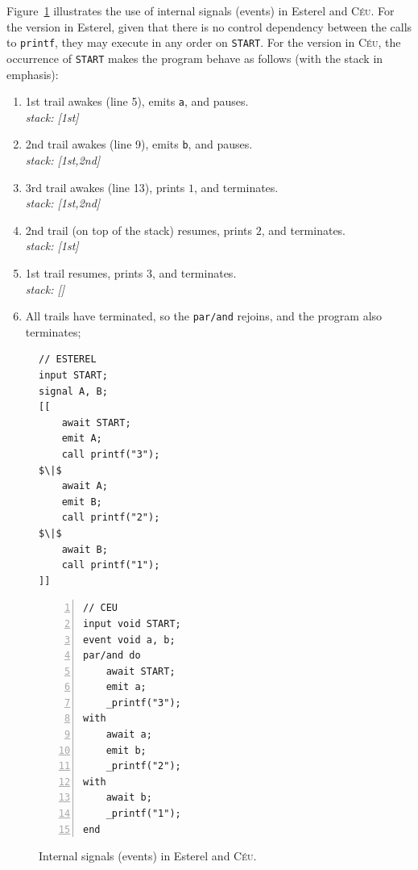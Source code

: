 \documentclass{acm_proc_article-sp}
\newcommand{\CEU}{\textsc{C\'{e}u}\xspace}
\newcommand{\code}[1] {{\small{\texttt{#1}}}}
\newcommand{\1}{\;}
\newcommand{\2}{\;\;}
\newcommand{\3}{\;\;\;}
\newcommand{\5}{\;\;\;\;\;}
\begin{document}
Figure~\ref{lst.prints} illustrates the use of internal signals (events) in 
Esterel and \CEU.
%
For the version in Esterel, given that there is no control dependency between 
the calls to \code{printf}, they may execute in any order on \code{START}.
%
For the version in \CEU, the occurrence of \code{START} makes the program 
behave as follows (with the stack in emphasis):
%
{\small
\begin{enumerate}
\setlength{\itemsep}{0pt}
\item 1st trail awakes (line 5), emits \code{a}, and pauses.\\
    \emph{stack: [1st]}
\item 2nd trail awakes (line 9), emits \code{b}, and pauses.\\
    \emph{stack: [1st,2nd]}
\item 3rd trail awakes (line 13), prints $1$, and terminates.\\
    \emph{stack: [1st,2nd]}
\item 2nd trail (on top of the stack) resumes, prints $2$, and terminates.\\
    \emph{stack: [1st]}
\item 1st trail resumes, prints $3$, and terminates.\\
    \emph{stack: []}
\item All trails have terminated, so the \code{par/and} rejoins, and the 
program also terminates;
\end{enumerate}
}

\begin{figure}[!t]
\begin{minipage}[t]{0.49\linewidth}
\begin{lstlisting}[mathescape=true]
// ESTEREL
input START;
signal A, B;
[[
    await START;
    emit A;
    call printf("3");
$\|$
    await A;
    emit B;
    call printf("2");
$\|$
    await B;
    call printf("1");
]]
\end{lstlisting}
\end{minipage}
%
\begin{minipage}[t]{0.50\linewidth}
\begin{lstlisting}[numbers=left,xleftmargin=3em]
// CEU
input void START;
event void a, b;
par/and do
    await START;
    emit a;
    _printf("3");
with
    await a;
    emit b;
    _printf("2");
with
    await b;
    _printf("1");
end
\end{lstlisting}
\end{minipage}
\caption{ Internal signals (events) in Esterel and \CEU. \newline
\label{lst.prints}
}
\end{figure}
\end{document}
